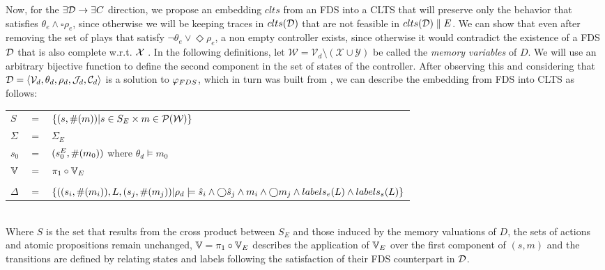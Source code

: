Now,  for the $\exists \mathcal{D} \rightarrow \exists C$ direction, we propose an embedding $clts$ from an FDS into a CLTS that will preserve only the behavior that satisfies $\theta_e \wedge \square \rho_e$, since otherwise we will be keeping traces in $clts(\mathcal{D})$ that are not feasible in $clts(\mathcal{D})\parallel E$. We can show that even after removing the set of plays that satisfy $\neg \theta_e \vee \Diamond \rho_e$, a non empty controller exists, since otherwise it would contradict the existence of a FDS $\mathcal{D}$ that is also complete w.r.t. ${\mathcal{X}}$ . In the following definitions, let $\mathcal{W}= \mathcal{V}_{d}\setminus (\mathcal{X} \cup \mathcal{Y})$ be called the \emph{memory variables} of $D$. We will use an arbitrary bijective function \enumSetDef to define the second component in the set of states of the controller. After observing this and considering that  $\mathcal{D}= \langle \mathcal{V}_d, \theta_d, \rho_d, \mathcal{J}_d, \mathcal{C}_d\rangle$ is a solution to $\varphi_{FDS}$, which in turn was built from \controlProblemDef,  we can describe the embedding \cltsEmbeddingDef{\fdsD} from FDS into CLTS as follows:

\vspace{1em}
\begin{tabular}{ l c l }
	$S$ &$=$& $\{(s,\#(m)) | s \in S_E \times m \in \mathcal{P}(\mathcal{W}) \}$\\
	$\Sigma$ &$=$&$\Sigma_E$\\	
	$s_0$&$=$&$(s_0^{E}, \#(m_0))$ where $\theta_d \models m_0$ \\
	$\mathbb{V}$&$=$&$\pi_1 \circ \mathbb{V}_E$\\
	&&\\
	$\Delta$&$=$&$\{((s_i,\#(m_i)),L,(s_j,\#(m_j))| \rho_d \models \hat{s}_{i} \wedge \bigcirc \hat{s}_{j} \wedge m_i \wedge \bigcirc m_j \wedge labels_e(L) \wedge labels_s(L) \}$\\
\end{tabular}
\vspace{1em}
\\
Where $S$ is the set that results from the cross product between $S_E$ and those induced by the memory valuations of $D$, the sets of actions and atomic propositions remain unchanged, $\mathbb{V}=\pi_1 \circ \mathbb{V}_E$ describes the application of $\mathbb{V}_E$ over the first component of $(s,m)$ and the transitions are defined by relating states and labels following the satisfaction of their FDS counterpart in $\mathcal{D}$.

